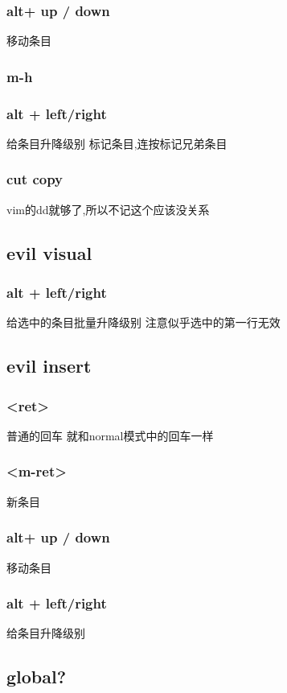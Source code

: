 \documentclass[12pt,a4paper]{article}
\begin{document}
\subsubsection{alt+ up / down}
\label{sec:orgheadline46}
移动条目
\subsubsection{m-h}
\label{sec:orgheadline47}
\subsubsection{alt + left/right}
\label{sec:orgheadline48}
给条目升降级别
标记条目,连按标记兄弟条目
\subsubsection{cut copy}
\label{sec:orgheadline49}
vim的dd就够了,所以不记这个应该没关系
\subsection{evil visual}
\label{sec:orgheadline52}
\subsubsection{alt + left/right}
\label{sec:orgheadline51}
给选中的条目批量升降级别
注意似乎选中的第一行无效
\subsection{evil insert}
\label{sec:orgheadline57}
\subsubsection{<ret>}
\label{sec:orgheadline53}
普通的回车 就和normal模式中的回车一样
\subsubsection{<m-ret>}
\label{sec:orgheadline54}
新条目
\subsubsection{alt+ up / down}
\label{sec:orgheadline55}
移动条目
\subsubsection{alt + left/right}
\label{sec:orgheadline56}
给条目升降级别
\subsection{global?}
\label{sec:orgheadline61}
\end{document}

